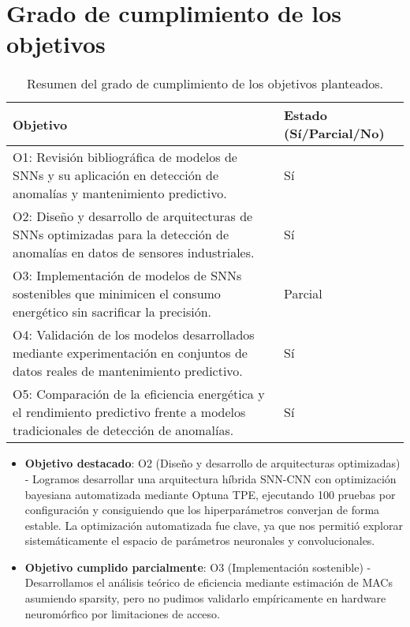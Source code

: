 \section{Grado de cumplimiento de los objetivos}
\begin{table}[htbp]
    \centering
    \small
    \begin{tabular}{p{}p{}}
        \hline\hline
        \textbf{Objetivo} & \textbf{Estado (Sí/Parcial/No)} \\
        \hline
        O1: Revisión bibliográfica de modelos de SNNs y su aplicación en detección de anomalías y mantenimiento predictivo. & Sí \\
        O2: Diseño y desarrollo de arquitecturas de SNNs optimizadas para la detección de anomalías en datos de sensores industriales. & Sí \\
        O3: Implementación de modelos de SNNs sostenibles que minimicen el consumo energético sin sacrificar la precisión. & Parcial \\
        O4: Validación de los modelos desarrollados mediante experimentación en conjuntos de datos reales de mantenimiento predictivo. & Sí \\
        O5: Comparación de la eficiencia energética y el rendimiento predictivo frente a modelos tradicionales de detección de anomalías. & Sí \\ 
        \hline\hline
    \end{tabular}
    \caption{Resumen del grado de cumplimiento de los objetivos planteados.}
    \label{tab:objetivos-cumplimiento}
\end{table}


\begin{itemize}
    \item \textbf{Objetivo destacado}: O2 (Diseño y desarrollo de arquitecturas optimizadas) - Logramos desarrollar una arquitectura híbrida SNN-CNN con optimización bayesiana automatizada mediante Optuna TPE, ejecutando 100 pruebas por configuración y consiguiendo que los hiperparámetros converjan de forma estable. La optimización automatizada fue clave, ya que nos permitió explorar sistemáticamente el espacio de parámetros neuronales y convolucionales.
    \item \textbf{Objetivo cumplido parcialmente}: O3 (Implementación sostenible) - Desarrollamos el análisis teórico de eficiencia mediante estimación de MACs asumiendo sparsity, pero no pudimos validarlo empíricamente en hardware neuromórfico por limitaciones de acceso.
\end{itemize}

